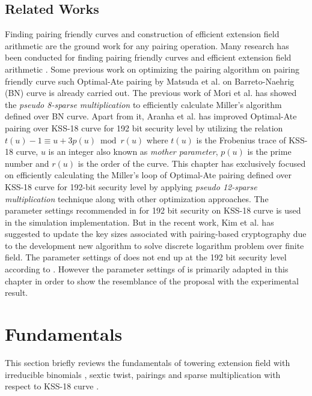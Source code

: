 \subsection{Related Works}
Finding pairing friendly curves \cite{EPRINT:FreScoTes06} and construction of efficient extension field arithmetic are the ground work for any pairing operation.
Many research  has been conducted for finding pairing friendly curves \cite{SCN:BarLynSco02, JC:DupEngMor05} and efficient extension field arithmetic \cite{JC:BaiPaa01}.
Some previous work on optimizing the pairing algorithm on pairing friendly curve such Optimal-Ate pairing by Matsuda et al. \cite{EPRINT:MKHO07} on Barreto-Naehrig (BN) curve \cite{SAC:BarNae05} is already carried out.
The previous work of Mori et al. \cite{PAIRING:MANS13} has showed the \textit{pseudo 8-sparse multiplication} to efficiently calculate Miller's algorithm defined over BN curve. Apart from it, Aranha et al. \cite{PAIRING:AFKMR12} has improved Optimal-Ate pairing over KSS-18 curve for 192 bit security level by utilizing the relation $t(u) - 1 \equiv u + 3p(u) \bmod r(u)$ where $t(u)$ is the Frobenius trace of KSS-18 curve, $u$ is an integer also known as \textit{mother parameter}, $p(u)$ is the prime number and $r(u)$ is the order of the curve. This chapter has exclusively focused on efficiently calculating the Miller's loop of Optimal-Ate pairing defined over KSS-18 curve \cite{EPRINT:KacSchSco07} for 192-bit security level by applying\textit{ pseudo 12-sparse multiplication} technique along with other optimization approaches. The parameter settings recommended in \cite{PAIRING:AFKMR12} for 192 bit security on KSS-18 curve is used in the simulation implementation. But in the recent work, Kim et al. \cite{C:KimBar16} has suggested to update the key sizes associated with pairing-based cryptography due to the development new algorithm to solve discrete logarithm problem over finite field. The parameter settings of \cite{PAIRING:AFKMR12} does not end up at the 192 bit security level according to \cite{C:KimBar16}. However the parameter settings of \cite{PAIRING:AFKMR12}  is primarily adapted in this chapter in order to show the resemblance of the proposal with the experimental result.

\section{Fundamentals}
This section briefly reviews the fundamentals of towering extension field with irreducible binomials \cite{JC:BaiPaa01}, sextic twist, pairings and sparse multiplication \cite{PAIRING:MANS13} with respect to KSS-18 curve \cite{EPRINT:KacSchSco07}.
